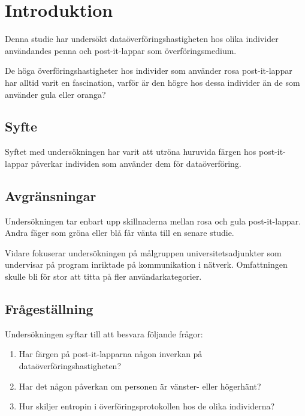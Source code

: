 \section{Introduktion}
\label{ch:intro}
Denna studie har undersökt dataöverföringshastigheten hos olika individer 
användandes penna och post-it-lappar som överföringsmedium.

De höga överföringshastigheter hos individer som använder rosa post-it-lappar 
har alltid varit en fascination, varför är den högre hos dessa individer än de 
som använder gula eller oranga?


\subsection{Syfte}
\label{sec:aim}
Syftet med undersökningen har varit att utröna huruvida färgen hos 
post-it-lappar påverkar individen som använder dem för dataöverföring.


\subsection{Avgränsningar}
\label{sec:delimit}
Undersökningen tar enbart upp skillnaderna mellan rosa och gula post-it-lappar.
Andra fäger som gröna eller blå får vänta till en senare studie.

Vidare fokuserar undersökningen på målgruppen universitetsadjunkter som 
undervisar på program inriktade på kommunikation i nätverk.
Omfattningen skulle bli för stor att titta på fler användarkategorier.


\subsection{Frågeställning}
\label{sec:problemstatement}
Undersökningen syftar till att besvara följande frågor:
\begin{enumerate}
  \item Har färgen på post-it-lapparna någon inverkan på 
    dataöverföringshastigheten?
  \item Har det någon påverkan om personen är vänster- eller högerhänt?
  \item Hur skiljer entropin i överföringsprotokollen hos de olika individerna?
\end{enumerate}
